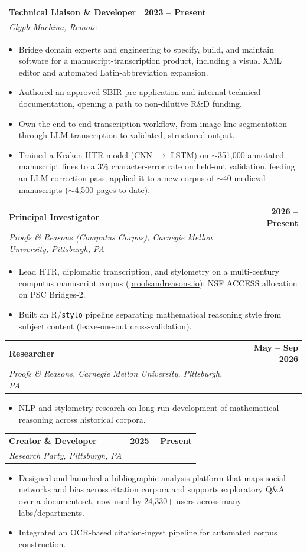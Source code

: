 \documentclass[11pt,letterpaper]{article}
\makeatletter
\newcommand{\entry}[4]{%
  \noindent\begin{tabularx}{\linewidth}{@{}X r@{}}
    \textbf{#1} & \textbf{#4}\\
    \textit{#2, #3} & \\
  \end{tabularx}\vspace{1pt}}
\makeatother
\begin{document}
\entry{Technical Liaison \& Developer}{Glyph Machina}{Remote}{2023 -- Present}
\begin{itemize}
  \item Bridge domain experts and engineering to specify, build, and maintain software for a manuscript-transcription product, including a visual XML editor and automated Latin-abbreviation expansion.
  \item Authored an approved SBIR pre-application and internal technical documentation, opening a path to non-dilutive R\&D funding.
  \item Own the end-to-end transcription workflow, from image line-segmentation through LLM transcription to validated, structured output.
  \item Trained a Kraken HTR model (CNN $\rightarrow$ LSTM) on $\sim$351{,}000 annotated manuscript lines to a 3\% character-error rate on held-out validation, feeding an LLM correction pass; applied it to a new corpus of $\sim$40 medieval manuscripts ($\sim$4{,}500 pages to date).
\end{itemize}
\vspace{5pt}

\entry{Principal Investigator}{Proofs \& Reasons (Computus Corpus), Carnegie Mellon University}{Pittsburgh, PA}{2026 -- Present}
\begin{itemize}
  \item Lead HTR, diplomatic transcription, and stylometry on a multi-century computus manuscript corpus (\href{https://proofsandreasons.io/}{proofsandreasons.io}); NSF ACCESS allocation on PSC Bridges-2.
  \item Built an R/\texttt{stylo} pipeline separating mathematical reasoning style from subject content (leave-one-out cross-validation).
\end{itemize}
\vspace{5pt}

\entry{Researcher}{Proofs \& Reasons, Carnegie Mellon University}{Pittsburgh, PA}{May -- Sep 2026}
\begin{itemize}
  \item NLP and stylometry research on long-run development of mathematical reasoning across historical corpora.
\end{itemize}
\vspace{5pt}

\entry{Creator \& Developer}{Research Party}{Pittsburgh, PA}{2025 -- Present}
\begin{itemize}
  \item Designed and launched a bibliographic-analysis platform that maps social networks and bias across citation corpora and supports exploratory Q\&A over a document set, now used by 24,330+ users across many labs/departments.
  \item Integrated an OCR-based citation-ingest pipeline for automated corpus construction.
\end{itemize}
\vspace{5pt}
\end{document}
